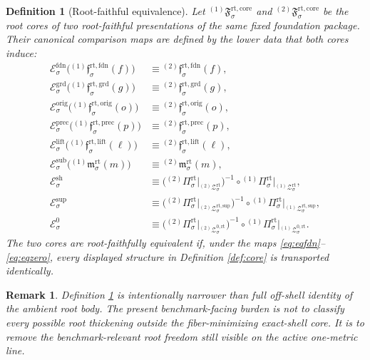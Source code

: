 \documentclass[11pt]{article}
\newcommand{\RootProj}[1]{\Pi_{#1}^{\mathrm{rt}}}
\newcommand{\RootFoundMin}[1]{\mathfrak f_{#1}^{\mathrm{rt,fdn}}}
\newcommand{\RootGroundMin}[1]{\mathfrak f_{#1}^{\mathrm{rt,grd}}}
\newcommand{\RootOrigMin}[1]{\mathfrak f_{#1}^{\mathrm{rt,orig}}}
\newcommand{\RootPrecMin}[1]{\mathfrak f_{#1}^{\mathrm{rt,prec}}}
\newcommand{\RootLiftMin}[1]{\mathfrak f_{#1}^{\mathrm{rt,lift}}}
\newcommand{\RootSubMin}[1]{\mathfrak m_{#1}^{\mathrm{rt}}}
\newcommand{\RootShellSet}[1]{\mathcal Z_{#1}^{\mathrm{rt}}}
\newcommand{\RootSupportShell}[1]{\mathcal Z_{#1}^{\mathrm{rt,sup}}}
\newcommand{\RootZeroCore}[1]{\mathcal Z_{#1}^{0,\mathrm{rt}}}
\newcommand{\RootCore}[1]{\mathfrak F_{#1}^{\mathrm{rt,core}}}
\newcommand{\RootMapFound}[1]{\mathcal E_{#1}^{\mathrm{fdn}}}
\newcommand{\RootMapGround}[1]{\mathcal E_{#1}^{\mathrm{grd}}}
\newcommand{\RootMapOrig}[1]{\mathcal E_{#1}^{\mathrm{orig}}}
\newcommand{\RootMapPrec}[1]{\mathcal E_{#1}^{\mathrm{prec}}}
\newcommand{\RootMapLift}[1]{\mathcal E_{#1}^{\mathrm{lift}}}
\newcommand{\RootMapSub}[1]{\mathcal E_{#1}^{\mathrm{sub}}}
\newcommand{\RootMapShell}[1]{\mathcal E_{#1}^{\mathrm{sh}}}
\newcommand{\RootMapSupport}[1]{\mathcal E_{#1}^{\mathrm{sup}}}
\newcommand{\RootMapZero}[1]{\mathcal E_{#1}^{0}}
\newtheorem{definition}{Definition}
\newtheorem{remark}{Remark}
\begin{document}
\begin{definition}[Root-faithful equivalence]
\label{def:equiv}
Let \({}^{(1)}\!\RootCore{\sigma}\) and \({}^{(2)}\!\RootCore{\sigma}\) be the root cores of two root-faithful presentations of the same fixed foundation package. Their canonical comparison maps are defined by the lower data that both cores induce:
\begin{align}
\RootMapFound{\sigma}\bigl({}^{(1)}\!\RootFoundMin{\sigma}(f)\bigr)
&\equiv
{}^{(2)}\!\RootFoundMin{\sigma}(f),
\label{eq:eqfdn}
\\
\RootMapGround{\sigma}\bigl({}^{(1)}\!\RootGroundMin{\sigma}(g)\bigr)
&\equiv
{}^{(2)}\!\RootGroundMin{\sigma}(g),
\label{eq:eqgrd}
\\
\RootMapOrig{\sigma}\bigl({}^{(1)}\!\RootOrigMin{\sigma}(o)\bigr)
&\equiv
{}^{(2)}\!\RootOrigMin{\sigma}(o),
\label{eq:eqorig}
\\
\RootMapPrec{\sigma}\bigl({}^{(1)}\!\RootPrecMin{\sigma}(p)\bigr)
&\equiv
{}^{(2)}\!\RootPrecMin{\sigma}(p),
\label{eq:eqprec}
\\
\RootMapLift{\sigma}\bigl({}^{(1)}\!\RootLiftMin{\sigma}(\ell)\bigr)
&\equiv
{}^{(2)}\!\RootLiftMin{\sigma}(\ell),
\label{eq:eqlift}
\\
\RootMapSub{\sigma}\bigl({}^{(1)}\!\RootSubMin{\sigma}(m)\bigr)
&\equiv
{}^{(2)}\!\RootSubMin{\sigma}(m),
\label{eq:eqsub}
\\
\RootMapShell{\sigma}
&\equiv
\bigl({}^{(2)}\!\RootProj{\sigma}\big|_{{}^{(2)}\!\RootShellSet{\sigma}}\bigr)^{-1}
\circ
{}^{(1)}\!\RootProj{\sigma}\big|_{{}^{(1)}\!\RootShellSet{\sigma}},
\label{eq:eqshell}
\\
\RootMapSupport{\sigma}
&\equiv
\bigl({}^{(2)}\!\RootProj{\sigma}\big|_{{}^{(2)}\!\RootSupportShell{\sigma}}\bigr)^{-1}
\circ
{}^{(1)}\!\RootProj{\sigma}\big|_{{}^{(1)}\!\RootSupportShell{\sigma}},
\label{eq:eqsupport}
\\
\RootMapZero{\sigma}
&\equiv
\bigl({}^{(2)}\!\RootProj{\sigma}\big|_{{}^{(2)}\!\RootZeroCore{\sigma}}\bigr)^{-1}
\circ
{}^{(1)}\!\RootProj{\sigma}\big|_{{}^{(1)}\!\RootZeroCore{\sigma}}.
\label{eq:eqzero}
\end{align}
The two cores are \emph{root-faithfully equivalent} if, under the maps \eqref{eq:eqfdn}--\eqref{eq:eqzero}, every displayed structure in Definition \ref{def:core} is transported identically.
\end{definition}

\begin{remark}
Definition \ref{def:equiv} is intentionally narrower than full off-shell identity of the ambient root body. The present benchmark-facing burden is not to classify every possible root thickening outside the fiber-minimizing exact-shell core. It is to remove the benchmark-relevant root freedom still visible on the active one-metric line.
\end{remark}
\end{document}
